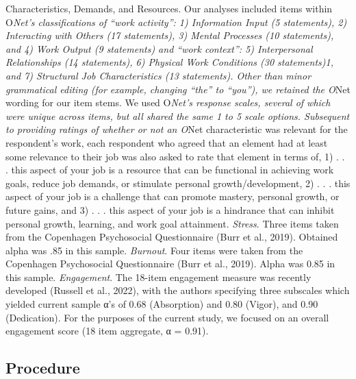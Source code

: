 \documentclass[
  man]{apa6}
\begin{document}
Characteristics, Demands, and Resources. Our analyses included items within O\emph{Net's classifications of ``work activity'': 1) Information Input (5 statements), 2) Interacting with Others (17 statements), 3) Mental Processes (10 statements), and 4) Work Output (9 statements) and ``work context'': 5) Interpersonal Relationships (14 statements), 6) Physical Work Conditions (30 statements)1, and 7) Structural Job Characteristics (13 statements).
Other than minor grammatical editing (for example, changing ``the'' to ``you''), we retained the O}Net wording for our item stems. We used O\emph{Net's response scales, several of which were unique across items, but all shared the same 1 to 5 scale options. Subsequent to providing ratings of whether or not an O}Net characteristic was relevant for the respondent's work, each respondent who agreed that an element had at least some relevance to their job was also asked to rate that element in terms of, 1) . . . this aspect of your job is a resource that can be functional in achieving work goals, reduce job demands, or stimulate personal growth/development, 2) . . . this aspect of your job is a challenge that can promote mastery, personal growth, or future gains, and 3) . . . this aspect of your job is a hindrance that can inhibit personal growth, learning, and work goal attainment.
\emph{Stress}. Three items taken from the Copenhagen Psychosocial Questionnaire (Burr et al., 2019). Obtained alpha was .85 in this sample.
\emph{Burnout}. Four items were taken from the Copenhagen Psychosocial Questionnaire (Burr et al., 2019). Alpha was 0.85 in this sample.
\emph{Engagement}. The 18-item engagement measure was recently developed (Russell et al., 2022), with the authors specifying three subscales which yielded current sample α's of 0.68 (Absorption) and 0.80 (Vigor), and 0.90 (Dedication). For the purposes of the current study, we focused on an overall engagement score (18 item aggregate, α = 0.91).

\hypertarget{procedure}{%
\subsection{Procedure}\label{procedure}}
\end{document}
